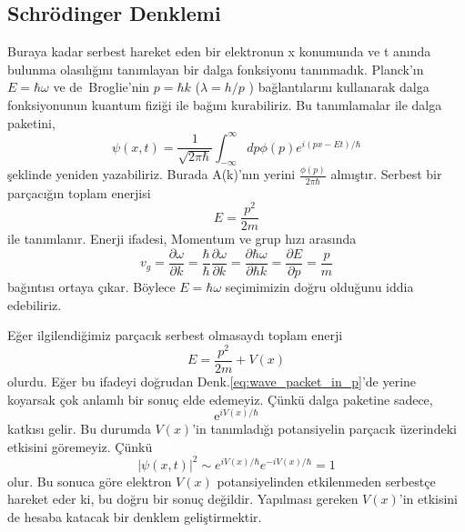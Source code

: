 \documentclass[a4paper,12pt, twoside]{article}
\begin{document}
\subsection{Schrödinger Denklemi}

Buraya kadar serbest hareket eden bir elektronun x konumunda ve t anında bulunma olasılığını tanımlayan bir dalga fonksiyonu tanınmadık. Planck'ın $E=\hbar\omega$  ve de~Broglie'nin $p=\hbar k$  ($\lambda = h/p$ )  bağlantılarını kullanarak  dalga fonksiyonunun kuantum fiziği ile bağını kurabiliriz.  Bu tanımlamalar ile dalga paketini,
\begin{equation}
\psi \left( x,t\right) =\dfrac {1}{\sqrt {2\pi \hbar }}\int ^{\infty }_{-\infty }dp\phi \left( p\right) e^{i\left( px-Et\right) /\hbar }
\label{eq:wave_packet_in_p}
\end{equation}
şeklinde yeniden yazabiliriz.  Burada A(k)'nın  yerini $\frac{\phi(p)}{2\pi\hbar}$  almıştır.  Serbest bir parçacığın toplam enerjisi
\begin{equation}
E=\dfrac {p^{2}}{2m}
\label{eq:free_particle_E}
\end{equation}
ile tanımlanır.  Enerji ifadesi,  Momentum ve grup hızı arasında
\begin{equation*}
v_{g}=\dfrac {\partial \omega }{\partial k}=\dfrac {\hbar }{\hbar }\dfrac {\partial \omega }{\partial k}=\dfrac {\partial\hbar \omega }{\partial \hbar k}=\dfrac {\partial E}{\partial p}=\dfrac {p}{m}
\end{equation*}
bağıntısı ortaya çıkar.  Böylece $E=\hbar \omega$ seçimimizin doğru olduğunu iddia edebiliriz. 

Eğer ilgilendiğimiz parçacık serbest olmasaydı toplam enerji
\begin{equation}
E=\dfrac {p^{2}}{2m} + V(x)
\label{eq:non_free_particle_E}
\end{equation}
olurdu.  Eğer bu ifadeyi doğrudan Denk.\ref{eq:wave_packet_in_p}'de yerine koyarsak çok anlamlı bir sonuç elde edemeyiz.  Çünkü dalga paketine sadece,
\begin{equation*}
\text{e}^{iV\left( x\right) /\hbar }
\end{equation*}
katkısı gelir.  Bu durumda $V(x)$'in  tanımladığı potansiyelin parçacık üzerindeki etkisini göremeyiz.  Çünkü
\begin{equation*}
\left| \psi \left( x,t\right) \right| ^{2}\sim e^{iV\left( x\right) /\hbar }e^{-iV\left( x\right) /\hbar }=1
\end{equation*}
olur. Bu sonuca göre elektron $V(x)$  potansiyelinden  etkilenmeden serbestçe hareket eder ki,  bu doğru bir  sonuç değildir. Yapılması gereken $V(x)$'in etkisini de hesaba katacak bir denklem geliştirmektir.
\end{document}
